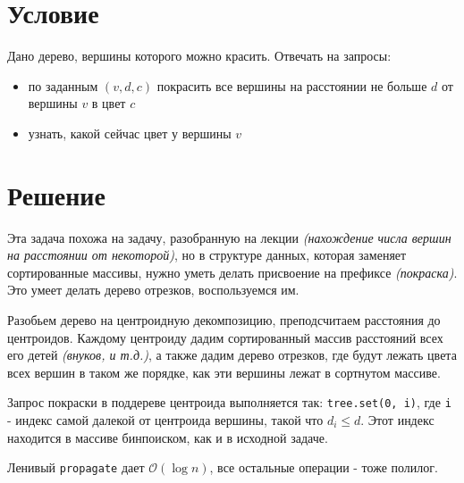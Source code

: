 \documentclass[12pt, a4paper]{article}
\begin{document}
    
\section*{Условие}

Дано дерево, вершины которого можно красить. Отвечать на запросы:
\begin{itemize}
    \item по заданным $(v, d, c)$ покрасить все вершины на расстоянии не больше $d$ от вершины $v$ в цвет $c$
    \item узнать, какой сейчас цвет у вершины $v$
\end{itemize}

\section*{Решение}

Эта задача похожа на задачу, разобранную на лекции \textit{(нахождение числа вершин на расстоянии от некоторой)}, но в структуре данных, которая заменяет сортированные массивы, нужно уметь делать присвоение на префиксе \textit{(покраска)}. Это умеет делать дерево отрезков, воспользуемся им.

Разобьем дерево на центроидную декомпозицию, преподсчитаем расстояния до центроидов. Каждому центроиду дадим сортированный массив расстояний всех его детей \textit{(внуков, и т.д.)}, а также дадим дерево отрезков, где будут лежать цвета всех вершин в таком же порядке, как эти вершины лежат в сортнутом массиве.

Запрос покраски в поддереве центроида выполняется так: \texttt{tree.set(0, i)}, где \texttt{i} - индекс самой далекой от центроида вершины, такой что $d_i \le d$. Этот индекс находится в массиве бинпоиском, как и в исходной задаче.

Ленивый \texttt{propagate} дает $\mathcal O (\log n)$, все остальные операции - тоже полилог.
\end{document}
